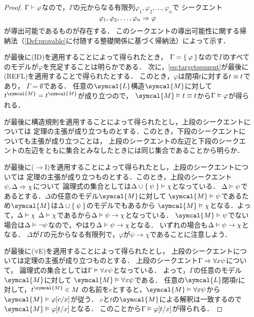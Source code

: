 \begin{proof}
	\(\Gamma \vdash \varphi\)なので，\(\Gamma\)の元からなる有限列\(\varphi_1, \varphi_2, \dots, \varphi_n\)で
	シークエント
	\begin{equation}
		\varphi_1, \varphi_2, \dots, \varphi_n \Rightarrow \varphi
		\label{eq:targetsequent}
	\end{equation}
	が導出可能であるものが存在する．
	このシークエントの導出可能性に関する帰納法（\cref{Def:provable}に付随する整礎関係に基づく帰納法）によって示す．

	が最後に(ID)を適用することによって得られたとき，
	\(\Gamma = \Set{\varphi}\)なので\(\Gamma\)のすべてのモデルが\(\varphi\)を充足することは明らかである．
	次に，\cref{eq:targetsequent}が最後に(REFL)を適用することで得られたとする．
	このとき，\(\varphi\)は閉項\(t\)に対する\(t \equiv t\)であり，
	\(\Gamma = \emptyset\)である．
	任意の\(\symcal{L}\)構造\(\symcal{M}\)に対して
	\(\interpretation{\symcal{M}}{t} = \interpretation{\symcal{M}}{t}\)が成り立つので，
	\(\symcal{M} \satisfy t \objeq t\)から\(\Gamma \vDash \varphi\)が得られる．

	が最後に構造規則を適用することによって得られたとし，上段のシークエントについては
	定理の主張が成り立つものとする．このとき，下段のシークエントについても主張が成り立つことは，
	上段のシークエントの左辺と下段のシークエントの左辺をともに集合とみなしたときには同じ集合であることから明らか．

	が最後に(\(\to\)I)を適用することによって得られたとし，上段のシークエントについては
	定理の主張が成り立つものとする．このとき，上段のシークエント\(\psi, \Delta \Rightarrow \chi\)について
	論理式の集合としては\(\Delta \cup \Set{\psi} \vDash \chi\)となっている．
	\(\Delta \vDash \psi\)であるとする．\(\Delta\)の任意のモデル\(\symcal{M}\)に対して
	\(\symcal{M} \satisfy \psi\)であるため\(\symcal{M}\)は\(\Delta \cup \Set{\psi}\)のモデルでもあるから
	\(\symcal{M} \satisfy \chi\)となる．よって，\(\Delta \vDash \chi\)
	\(\Delta \vDash \chi\)であるから\(\Delta \vDash \psi \to \chi\)となっている．
	\(\symcal{M} \satisfy \psi\)でない場合は\(\Delta \vDash \lnot \psi\)なので，やはり\(\Delta \vDash \psi \to \chi\)となる．
	いずれの場合も\(\Delta \vDash \psi \to \chi\)となる．
	\(\Delta\)が\(\Gamma\)の元からなる有限列で，\(\varphi\)が\(\psi \to \chi\)であることに注意しよう．

	が最後に(\(\forall\)E)を適用することによって得られたとし，
	上段のシークエントについては定理の主張が成り立つものとする．
	上段のシークエント\(\Gamma \Rightarrow \forall x \psi\)について，
	論理式の集合としては\(\Gamma \vDash \forall x \psi\)となっている．
	よって，\(\Gamma\)の任意のモデル\(\symcal{M}\)に対して
	\(\symcal{M} \satisfy \forall x \psi\)である．
	任意の\(\symcal{L}\)閉項\(t\)に対して，\(\interpretation{\symcal{M}}{t} \in M\)
	の名前を\(c\)とすると，\(\symcal{M} \satisfy \forall x \psi\)から
	\(\symcal{M} \satisfy \subst{\varphi}{c/x}\)が従う．
	\(c\)と\(t\)の\(\symcal{M}\)による解釈は一致するので
	\(\symcal{M} \satisfy \subst{\varphi}{t/x}\)となる．
	このことから\(\Gamma \satisfy \subst{\varphi}{t/x}\)が得られる．


\end{proof}
